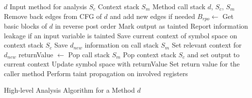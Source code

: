 \documentclass[10pt]{elsarticle}
\begin{document}
 \begin{algorithm}
\begin{algorithmic}[1]
\INPUT
\Statex $d$ \Comment Input method for analysis
\Statex $S_c$  \Comment Context stack
\Statex $S_m$  \Comment Method call stack
 {$d$, $S_c$, $S_m$}
	\State Remove back edges from CFG of $d$ and add new edges if needed
	\State $B_{rpo} \leftarrow$ Get basic blocks of $d$ in reverse post order\;
				\State Mark output as tainted
				\State Report information leakage if an input variable is tainted
				\State Save current context of symbol space on context stack $S_c$
				\State Save $d_{new}$ information on call stack $S_m$
				\State Set relevant context for $d_{new}$
				\State returnValue $\leftarrow${}
				\State Pop call stack $S_m$
				\State Pop context stack $S_c$ and set output to current context
				\State Update symbol space with returnValue
				\State Set return value for the caller method
			\Else
				\State Perform taint propagation on involved registers
			\EndIf
		\EndFor		
	\EndFor	
\EndProcedure
\end{algorithmic}
\caption{High-level Analysis Algorithm for a Method $d$}\label{methodAnalyzer}
\end{algorithm}
\end{document}
